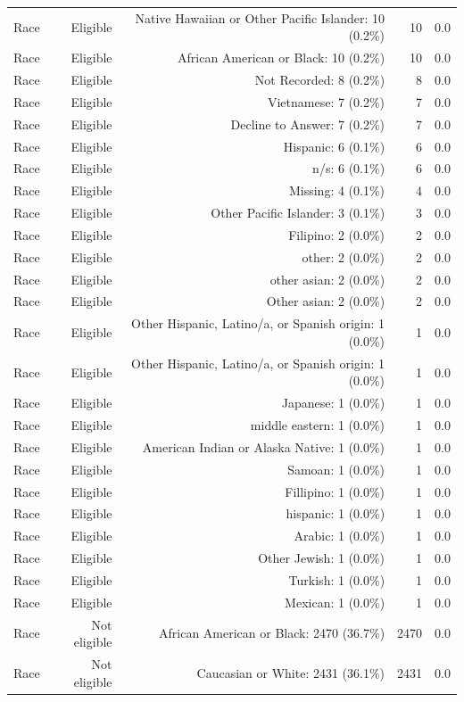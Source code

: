 \begin{table}[htbp]
\begin{tabular}{lrrrr}
Race & Eligible & Native Hawaiian or Other Pacific Islander: 10 (0.2\%) & 10 & 0.0 \\
Race & Eligible & African American or Black: 10 (0.2\%) & 10 & 0.0 \\
Race & Eligible & Not Recorded: 8 (0.2\%) & 8 & 0.0 \\
Race & Eligible & Vietnamese: 7 (0.2\%) & 7 & 0.0 \\
Race & Eligible & Decline to Answer: 7 (0.2\%) & 7 & 0.0 \\
Race & Eligible & Hispanic: 6 (0.1\%) & 6 & 0.0 \\
Race & Eligible & n/s: 6 (0.1\%) & 6 & 0.0 \\
Race & Eligible & Missing: 4 (0.1\%) & 4 & 0.0 \\
Race & Eligible & Other Pacific Islander: 3 (0.1\%) & 3 & 0.0 \\
Race & Eligible & Filipino: 2 (0.0\%) & 2 & 0.0 \\
Race & Eligible & other: 2 (0.0\%) & 2 & 0.0 \\
Race & Eligible & other asian: 2 (0.0\%) & 2 & 0.0 \\
Race & Eligible & Other asian: 2 (0.0\%) & 2 & 0.0 \\
Race & Eligible &  Other Hispanic, Latino/a, or Spanish origin: 1 (0.0\%) & 1 & 0.0 \\
Race & Eligible & Other Hispanic, Latino/a, or Spanish origin: 1 (0.0\%) & 1 & 0.0 \\
Race & Eligible & Japanese: 1 (0.0\%) & 1 & 0.0 \\
Race & Eligible & middle eastern: 1 (0.0\%) & 1 & 0.0 \\
Race & Eligible & American Indian or Alaska Native: 1 (0.0\%) & 1 & 0.0 \\
Race & Eligible & Samoan: 1 (0.0\%) & 1 & 0.0 \\
Race & Eligible & Fillipino: 1 (0.0\%) & 1 & 0.0 \\
Race & Eligible & hispanic: 1 (0.0\%) & 1 & 0.0 \\
Race & Eligible & Arabic: 1 (0.0\%) & 1 & 0.0 \\
Race & Eligible & Other Jewish: 1 (0.0\%) & 1 & 0.0 \\
Race & Eligible & Turkish: 1 (0.0\%) & 1 & 0.0 \\
Race & Eligible & Mexican: 1 (0.0\%) & 1 & 0.0 \\
Race & Not eligible & African American  or Black: 2470 (36.7\%) & 2470 & 0.0 \\
Race & Not eligible & Caucasian or White: 2431 (36.1\%) & 2431 & 0.0 \\

\end{tabular}
\end{table}
